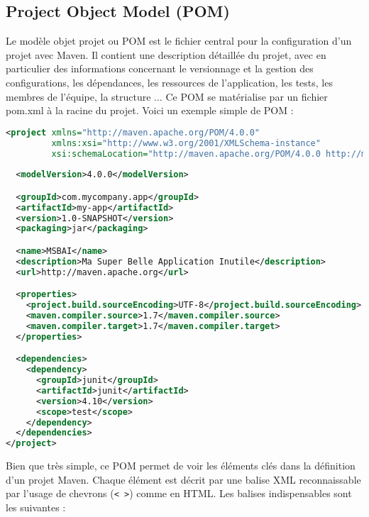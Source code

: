 \documentclass[a4paper,11pt]{article}
\begin{document}
\subsection{Project Object Model (POM)}
Le modèle objet projet ou POM est le fichier central pour la configuration d'un projet avec Maven. Il contient une 
description détaillée du projet, avec en particulier des informations concernant le versionnage et la gestion des configurations, 
les dépendances, les ressources de l'application, les tests, les membres de l'équipe, la structure ...
Ce POM se matérialise par un fichier pom.xml à la racine du projet. Voici un exemple simple de POM :
\begin{lstlisting}[language=XML]
<project xmlns="http://maven.apache.org/POM/4.0.0" 
         xmlns:xsi="http://www.w3.org/2001/XMLSchema-instance"
         xsi:schemaLocation="http://maven.apache.org/POM/4.0.0 http://maven.apache.org/xsd/maven-4.0.0.xsd">
         
  <modelVersion>4.0.0</modelVersion>

  <groupId>com.mycompany.app</groupId>
  <artifactId>my-app</artifactId>
  <version>1.0-SNAPSHOT</version>
  <packaging>jar</packaging>

  <name>MSBAI</name>
  <description>Ma Super Belle Application Inutile</description>
  <url>http://maven.apache.org</url>

  <properties>
    <project.build.sourceEncoding>UTF-8</project.build.sourceEncoding>
    <maven.compiler.source>1.7</maven.compiler.source>
    <maven.compiler.target>1.7</maven.compiler.target>
  </properties>

  <dependencies>
    <dependency>
      <groupId>junit</groupId>
      <artifactId>junit</artifactId>
      <version>4.10</version>
      <scope>test</scope>
    </dependency>
  </dependencies>
</project>
\end{lstlisting}
Bien que très simple, ce POM permet de voir les éléments clés dans la définition d'un projet Maven. Chaque élément est 
décrit par une balise XML reconnaissable par l'usage de chevrons (\texttt{< >}) comme en HTML. 
Les balises indispensables sont les suivantes :
\end{document}
